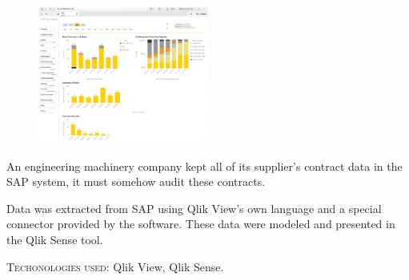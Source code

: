 


    \cvparagraph
    {
      \begin{figure}
        \centering
        \vspace{-10pt}
        \includegraphics[width=0.5\textwidth]{img/project2}
      \end{figure}
      An engineering machinery company kept all of its supplier's contract data in the SAP system, it must somehow audit these contracts.

      Data was extracted from SAP using Qlik View's own language and a special connector provided by the software. These data were modeled and presented in the Qlik Sense tool.

      \textsc{Techonologies used}: Qlik View, Qlik Sense.
      \vfill
    }



